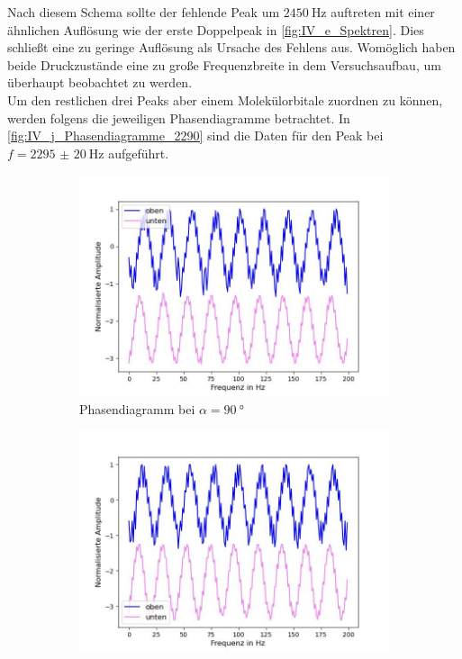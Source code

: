 \documentclass[../main.tex]{subfiles}
\begin{document}
        Nach diesem Schema sollte der fehlende Peak um $\SI{2450}{\hertz}$ auftreten mit einer ähnlichen Auflösung wie der erste Doppelpeak in \ref{fig:IV_e_Spektren}. Dies schließt eine zu geringe Auflösung als Ursache des Fehlens aus. Womöglich haben beide Druckzustände eine zu große Frequenzbreite in dem Versuchsaufbau, um überhaupt beobachtet zu werden.\\

        Um den restlichen drei Peaks aber einem Molekülorbitale zuordnen zu können, werden folgens die jeweiligen Phasendiagramme betrachtet. In \ref{fig:IV_j_Phasendiagramme_2290} sind die Daten für den Peak bei $f=\SI{2295(20)}{\hertz}$ aufgeführt.

        \begin{figure}[H]
            \centering
            \begin{subfigure}[b]{0.45\textwidth}
                \centering
                \includegraphics[width=\textwidth]{Bilddateien/Auswertung/IV_j_Phasen2205_90Grad.jpg}
                \caption{Phasendiagramm bei $\alpha=\SI{90}{\degree}$}
                \label{fig:IV_j_Phasen2205_90Grad}
            \end{subfigure}
            \hfill
            \begin{subfigure}[b]{0.45\textwidth}
                \centering
                \includegraphics[width=\textwidth]{Bilddateien/Auswertung/IV_j_Phasen2205_180Grad.jpg}

\end{subfigure}
\end{figure}
\end{document}
